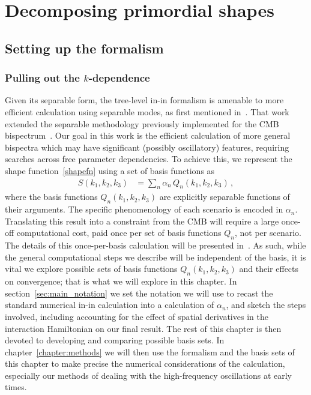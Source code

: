 %
\chapter{Decomposing primordial shapes}\label{chapter:decomp}
\section{Setting up the formalism}\label{sec:setting_notation}
    \subsection{Pulling out the $k$-dependence}\label{sec:k_dep}
    Given its separable form, the tree-level in-in formalism is amenable
to more efficient calculation using separable modes, as first mentioned in~\cite{Funakoshi}.
That work extended the separable methodology previously implemented for the CMB
bispectrum~\cite{FergShell_1,FergShell_2,FergShell_3}.
Our goal in this work is the efficient calculation of more general bispectra
which may have significant (possibly oscillatory) features, requiring searches across free parameter dependencies.
To achieve this, we represent the shape function~\eqref{shapefn} using a set of basis functions as
\begin{align}\label{goal}
S(k_1, k_2,k_3) &= \sum_n \alpha_n  \, Q_n(k_1,k_2,k_3)\,,
\end{align}
where the basis functions $Q_n(k_1,k_2,k_3)$ are explicitly separable functions of their arguments.
The specific phenomenology of each scenario is encoded in $\alpha_n$.
Translating this result into a constraint from the CMB
will require a large once-off computational cost, paid once
per set of basis functions $Q_n$,
not per scenario.
The details of this once-per-basis calculation will be
presented in~\cite{Sohn_2021}.
As such, while the general computational steps we
describe will be independent of the basis, it is vital we
explore possible sets of basis functions $Q_n(k_1,k_2,k_3)$
and their effects on convergence;
that is what we will explore in this chapter.
In section~\ref{sec:main_notation} we set the notation we will use to recast
the standard numerical in-in calculation into a calculation of $\alpha_n$,
and sketch the steps involved, including accounting for the effect of spatial derivatives
in the interaction Hamiltonian on our final result.
The rest of this chapter is then devoted to developing and comparing possible basis sets.
In chapter~\ref{chapter:methods} we will then use the formalism and the basis sets of this chapter to
make precise the numerical considerations of the calculation,
especially our methods of dealing with the high-frequency
oscillations at early times.

